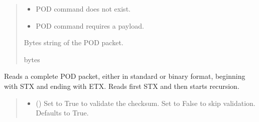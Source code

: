 \documentclass[letterpaper,10pt,english]{sphinxmanual}
\begin{document}
\begin{fulllineitems}
\begin{fulllineitems}
\begin{quote}
\begin{description}
\begin{itemize}
\item {} 
\sphinxAtStartPar
{} \textendash{} POD command does not exist.

\item {} 
\sphinxAtStartPar
{} \textendash{} POD command requires a payload.

\end{itemize}

\sphinxAtStartPar
Bytes string of the POD packet.

\sphinxAtStartPar
bytes

\end{description}\end{quote}

\end{fulllineitems}


\begin{fulllineitems}
\label{\detokenize{BasicPodProtocol:BasicPodProtocol.POD_Basics.ReadPODpacket}}
\pysigstartsignatures
{}
\pysigstopsignatures
\sphinxAtStartPar
Reads a complete POD packet, either in standard or binary format, beginning with STX and         ending with ETX. Reads first STX and then starts recursion.
\begin{quote}\begin{description}
\begin{itemize}
\item {} 
\sphinxAtStartPar
{} (\sphinxstyleliteralemphasis{\sphinxupquote{, }}) \textendash{} Set to True to validate the checksum. Set to False to                 skip validation. Defaults to True.


\end{itemize}
\end{description}
\end{quote}
\end{fulllineitems}
\end{fulllineitems}
\end{document}
